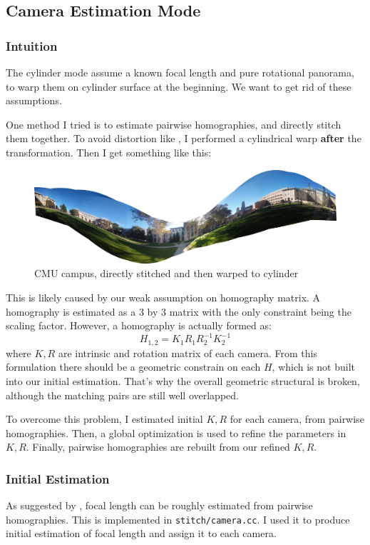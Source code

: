
\subsection{Camera Estimation Mode}
\label{sec:camera_estimate}
\subsubsection{Intuition}
The cylinder mode assume a known focal length and pure rotational panorama, to
warp them on cylinder surface at the beginning.
We want to get rid of these assumptions.

One method I tried is to estimate pairwise homographies,
and directly stitch them together. To avoid distortion like ,
I performed a cylindrical warp \textbf{after} the transformation.
Then I get something like this:
\begin{figure}[H]
  \centering
  \includegraphics[width=1\textwidth]{res/CMU1-noestimate.jpg}
  \caption{CMU campus, directly stitched and then warped to cylinder}
\end{figure}

This is likely caused by our weak assumption on homography matrix.
A homography is estimated as a 3 by 3 matrix with the only
constraint being the scaling factor. However,
a homography is actually formed as:
\[ H_{1,2} = K_1R_1R_2^{-1}K_2^{-1}\]
where $K,R$ are intrinsic and rotation matrix of each camera.
From this formulation there should be a geometric constrain on each $H$,
which is not built into our initial estimation.
That's why the overall geometric structural is broken, although the matching pairs
are still well overlapped.

To overcome this problem, I estimated initial $K, R$ for each camera, from pairwise homographies.
Then, a global optimization is used to refine the parameters in $K, R$.
Finally, pairwise homographies are rebuilt from our refined $K, R$.

\subsubsection{Initial Estimation}
As suggested by \cite{focal}, focal length
can be roughly estimated from pairwise homographies. This is implemented in \verb|stitch/camera.cc|.
I used it to produce initial estimation of
focal length and assign it to each camera.

